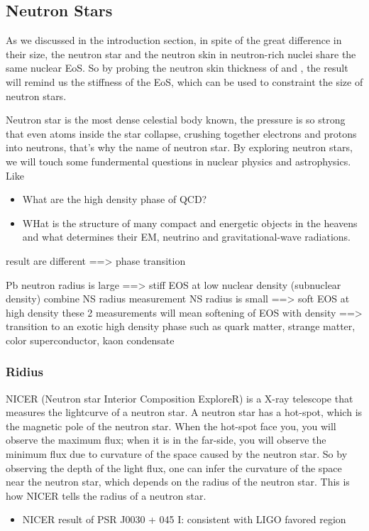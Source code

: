 \subsection{Neutron Stars}
As we discussed in the introduction section, in spite of the great difference
in their size, the neutron star and the neutron skin in neutron-rich nuclei
share the same nuclear EoS. So by probing the neutron skin thickness of \Pb and
\Ca, the result will remind us the stiffness of the EoS, which can be used to
constraint the size of neutron stars.

Neutron star is the most dense celestial body known, the pressure is so strong
that even atoms inside the star collapse, crushing together electrons
and protons into neutrons, that's why the name of neutron star. By exploring
neutron stars, we will touch some fundermental questions in nuclear physics and 
astrophysics. Like
\begin{itemize}
    \item What are the high density phase of QCD?
    \item WHat is the structure of many compact and energetic objects in the heavens
	and what determines their EM, neutrino and gravitational-wave radiations.
\end{itemize}

result are different ==> phase transition

Pb neutron radius is large ==> stiff EOS at low nuclear density (subnuclear density)
combine NS radius measurement
NS radius is small ==> soft EOS at high density
these 2 measurements will mean softening of EOS with density ==> transition to
an exotic high density phase such as quark matter, strange matter, color
superconductor, kaon condensate

\subsubsection{Ridius}
NICER (Neutron star Interior Composition ExploreR) is a X-ray telescope that
measures the lightcurve of a neutron star. A neutron star has a hot-spot, which
is the magnetic pole of the neutron star. When the hot-spot face you, you will
observe the maximum flux; when it is in the far-side, you will observe the minimum
flux due to curvature of the space caused by the neutron star. So by observing 
the depth of the light flux, one can infer the curvature of the space near the
neutron star, which depends on the radius of the neutron star. This is how NICER
tells the radius of a neutron star.
\begin{itemize}
    \item NICER result of PSR J0030 + 045 I: consistent with LIGO favored region
\end{itemize}

